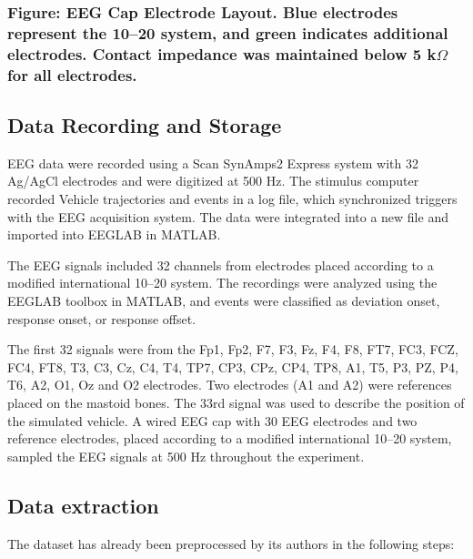 \documentclass[letterpaper]{article}
\newcommand\textstyleHeadingiiiChar[1]{\textrm{\textcolor[HTML]{1F3763}{#1}}}
\begin{document}
\subsubsection[Figure: EEG Cap Electrode Layout. Blue electrodes represent the 10–20 system, and green indicates
additional electrodes. Contact impedance was maintained below 5 k$\Omega $ for all electrodes.]{\textbf{Figure:}
\textstyleHeadingiiiChar{EEG Cap Electrode Layout. Blue electrodes represent the 10–20 system, and green indicates
additional electrodes. Contact impedance was maintained below 5 k$\Omega $ for all electrodes.}}

\bigskip

\subsection{Data Recording and Storage}
EEG data were recorded using a Scan SynAmps2 Express system with 32 Ag/AgCl electrodes and were digitized at 500 Hz. The
stimulus computer recorded Vehicle trajectories and events in a log file, which synchronized triggers with the EEG
acquisition system. The data were integrated into a new file and imported into EEGLAB in MATLAB.

The EEG signals included 32 channels from electrodes placed according to a modified international 10–20 system. The
recordings were analyzed using the EEGLAB toolbox in MATLAB, and events were classified as deviation onset, response
onset, or response offset.

The first 32 signals were from the Fp1, Fp2, F7, F3, Fz, F4, F8, FT7, FC3, FCZ, FC4, FT8, T3, C3, Cz, C4, T4, TP7, CP3,
CPz, CP4, TP8, A1, T5, P3, PZ, P4, T6, A2, O1, Oz and O2 electrodes. Two electrodes (A1 and A2) were references placed
on the mastoid bones. The 33rd signal was used to describe the position of the simulated vehicle. A wired EEG cap with
30 EEG electrodes and two reference electrodes, placed according to a modified international 10–20 system, sampled the
EEG signals at 500 Hz throughout the experiment.


\bigskip


\bigskip


\bigskip


\bigskip

\subsection{Data extraction}
The dataset has already been preprocessed by its authors in the following steps:
\end{document}
